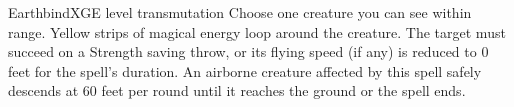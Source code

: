 \begin{spell}{Earthbind}{XGE}{ level transmutation}
{
}
Choose one creature you can see within range. Yellow
strips of magical energy loop around the creature. The
target must succeed on a Strength saving throw, or its
flying speed (if any) is reduced to 0 feet for the spell's
duration. An airborne creature affected by this spell safely
descends at 60 feet per round until it reaches the ground
or the spell ends.
\end{spell}